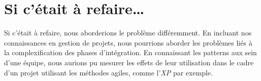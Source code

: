 \section{Si c'était à refaire…}

Si c'était à refaire, nous aborderions le problème différemment. En incluant nos connaissances en gestion de projets, nous pourrions aborder les problèmes liés à la complexification des phases d'intégration. En connaissant les patterns aux sein d'une équipe, nous aurions pu mesurer les effets de leur utilisation dans le cadre d'un projet utilisant les
méthodes agiles, comme l'\emph{XP} par exemple.
